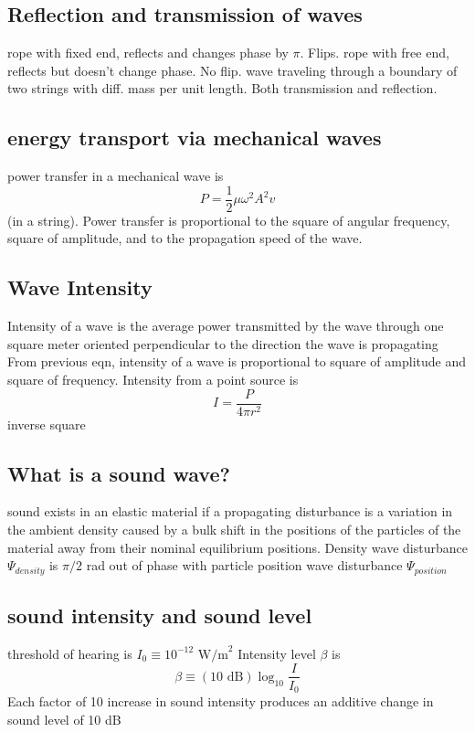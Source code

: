 \documentclass[twocolumn]{article}
\begin{document}
\subsection{Reflection and transmission of waves}
\begin{outline}
    \1 rope with fixed end, reflects and changes phase by $\pi$. Flips.
    \1 rope with free end, reflects but doesn't change phase. No flip. 
    \1 wave traveling through a boundary of two strings with diff. mass per unit length. Both transmission and reflection. 
\end{outline}
\subsection{energy transport via mechanical waves}
\begin{outline}
\1 power transfer in a mechanical wave is \[P=\dfrac{1}{2}\mu\omega^2A^2v\] (in a string). Power transfer is proportional to the square of angular frequency, square of amplitude, and to the propagation speed of the wave. 
\end{outline}
\subsection{Wave Intensity}
\begin{outline}
    \1 Intensity of a wave is the average power transmitted by the wave through one square meter oriented perpendicular to the direction the wave is propagating
    \1 From previous eqn, intensity of a wave is proportional to square of amplitude and square of frequency. 
    \1 Intensity from a point source is \[I=\dfrac{P}{4\pi r^2}\] inverse square
\end{outline}
\subsection{What is a sound wave?}
\begin{outline}
    \1 sound exists in an elastic material if a propagating disturbance is a variation in the ambient density caused by a bulk shift in the positions of the particles of the material away from their nominal equilibrium positions. \1 Density wave disturbance $\Psi_{density}$ is $\pi/2$ rad out of phase with particle position wave disturbance $\Psi_{position}$
\end{outline}
\subsection{sound intensity and sound level}
\begin{outline}
    \1 threshold of hearing is \(I_0\equiv10^{-12}\text{ W/m}^2\)
    \1 Intensity level $\beta$ is \[\beta\equiv(10\text{ dB})\log_{10}\dfrac{I}{I_0}\]
    \1 Each factor of 10 increase in sound intensity produces an additive change in sound level of 10 dB
\end{outline}
\end{document}
